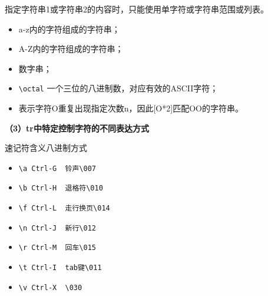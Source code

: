 指定字符串1或字符串2的内容时，只能使用单字符或字符串范围或列表。
\begin{itemize}
\item [a-z] a-z内的字符组成的字符串；
\item [A-Z] A-Z内的字符组成的字符串；
\item [0-9] 数字串；
\item \verb|\octal| 一个三位的八进制数，对应有效的ASCII字符；
\item [O*n] 表示字符O重复出现指定次数n，因此[O*2]匹配OO的字符串。
\end{itemize}

\textbf{（3）tr中特定控制字符的不同表达方式}

速记符含义八进制方式
\begin{itemize}
\item \verb|\a Ctrl-G  铃声\007|
\item \verb|\b Ctrl-H  退格符\010|
\item \verb|\f Ctrl-L  走行换页\014|
\item \verb|\n Ctrl-J  新行\012|
\item \verb|\r Ctrl-M  回车\015|
\item \verb|\t Ctrl-I  tab键\011|
\item \verb|\v Ctrl-X  \030|
\end{itemize}


